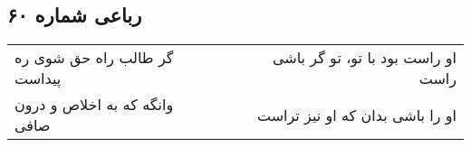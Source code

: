 \begin{center}
\section*{رباعی شماره ۶۰}
\label{sec:sh060}
\begin{longtable}{l p{0.5cm} r}
گر طالب راه حق شوی ره پیداست
&&
او راست بود با تو، تو گر باشی راست
\\
وانگه که به اخلاص و درون صافی
&&
او را باشی بدان که او نیز تراست
\\
\end{longtable}
\end{center}
